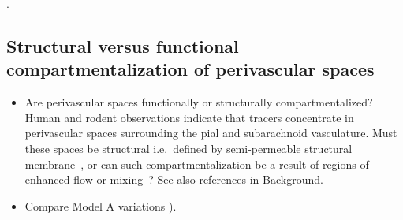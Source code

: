 \documentclass[fleqn,10pt]{wlscirep}
\newcommand{\draft}[1]{\textcolor{gray}{#1}}
\begin{document}
.

\subsection*{Structural versus functional compartmentalization of perivascular spaces}

\begin{itemize}
\item
  Are perivascular spaces functionally or structurally
  compartmentalized? Human and rodent observations indicate that
  tracers concentrate in perivascular spaces surrounding the pial and
  subarachnoid vasculature. Must these spaces be structural
  i.e.~defined by semi-permeable structural
  membrane~\cite{zhang1990interrelationships, zhang1992directional,
    mestre2018flow, eide2024functional}, or can such
  compartmentalization be a result of regions of enhanced flow or
  mixing~\cite{bedussi2017paravascular, vinje2021brain}? See also
  references in Background.
\item
  Compare Model A variations ).
\end{itemize}

\draft{\lipsum[1]}
\end{document}
